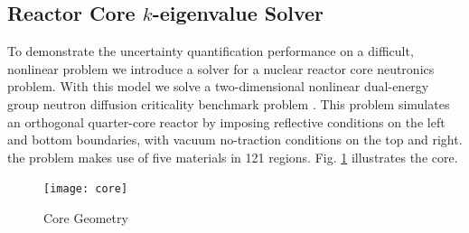 \documentclass{mc2015}
\begin{document}
\subsection{Reactor Core $k$-eigenvalue Solver}
To demonstrate the uncertainty quantification performance on a difficult, nonlinear problem we introduce a solver for a nuclear reactor core neutronics problem.  With this model we solve a two-dimensional nonlinear dual-energy group neutron diffusion criticality benchmark problem \cite{benchmark}.  This problem simulates an orthogonal quarter-core reactor by imposing reflective conditions on the left and bottom boundaries, with vacuum no-traction conditions on the top and right.  the problem makes use of five materials in 121 regions.  Fig. \ref{geom} illustrates the core.  
\begin{figure}[H]
\centering
  \texttt{[image: core]}
  \caption{Core Geometry}
  \label{geom}
\end{figure}
\end{document}
